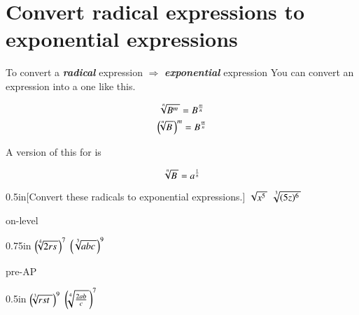 \section*{Convert radical expressions to exponential expressions}

\begin{myConcept}{%
        To convert 
        a {\bfseries\itshape radical} expression 
        $\Longrightarrow$
        {\bfseries\itshape exponential} expression
    }%
    You can convert an  expression into a  one like this.
    \begin{myCenteredBox}[width=3in]
        \Large
        \[
            \myRoot[n]{B^m}
            =
            B ^ {\frac{m}{n}}
        \]
        \[
            \left(\hspace{-0.25em} \myRoot[n]{B} \right)^m
            =
            B ^ {\frac{m}{n}}
        \]
    \end{myCenteredBox}
    A version of this for  is
    \begin{myCenteredBox}[width=3in]
        \Large
        \[
            \myRoot[n]{B}
            =
            a ^ {\frac{1}{n}}
        \]
    \end{myCenteredBox}
\end{myConcept}




\begin{my2Problems}{0.5in}[Convert these radicals to exponential expressions.]
    {
        $\myRoot{x^5}$ 
    }
    {
        $\myRoot[3]{(5z)^6}$ 
    }
\end{my2Problems}




\begin{taggedblock}{on-level}
    \begin{my2Problems}{0.75in}
        {
            $\left(\hspace{-0.25em}   \myRoot[4]{2rs}   \right)^7$ 
        }
        {
            $\left( \myRoot[3]{abc} \right)^9$ 
        }
    \end{my2Problems}
\end{taggedblock}
\begin{taggedblock}{pre-AP}
    \begin{my2Problems}{0.5in}
        {
            $\left(\hspace{-0.25em}   \myRoot[3]{rst\,}   \right)^9$ 
        }
        {
            $\left(\hspace{-0.25em}   \myRoot[4]{\frac{2ab}{c}}   \right)^7$ 
        }
    \end{my2Problems}
\end{taggedblock}




